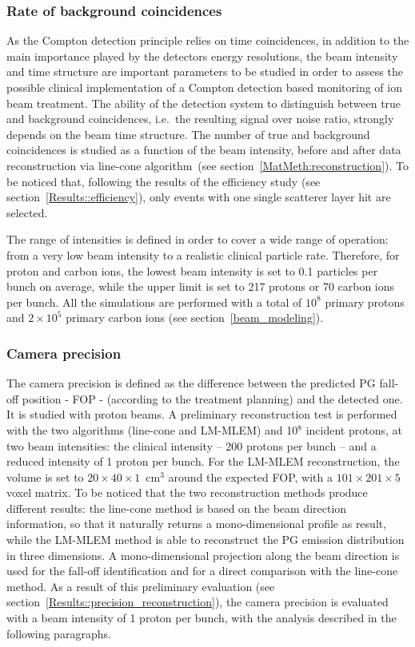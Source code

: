 \subsubsection{Rate of background coincidences}

As the Compton detection principle relies on time coincidences, in addition to the main importance played by the detectors energy resolutions, the beam intensity and time structure are important parameters to be studied in order to assess the possible clinical implementation of a Compton detection based monitoring of ion beam treatment. The ability of the detection system to distinguish between true and background coincidences, i.e.~the resulting signal over noise ratio, strongly depends on the beam time structure. The number of true and background coincidences is studied as a function of the beam intensity, before and after data reconstruction via line-cone algorithm~(see section~\ref{MatMeth:reconstruction}). To be noticed that, following the results of the efficiency study (see section~\ref{Results::efficiency}), only events with one single scatterer layer hit are selected. 

The range of intensities is defined in order to cover a wide range of operation: from a very low beam intensity to a realistic clinical particle rate. Therefore, for proton and carbon ions, the lowest beam intensity is set to 0.1 particles per bunch on average, while the upper limit is set to 217 protons or 70 carbon ions per bunch. All the simulations are performed with a total of $10^{8}$ primary protons and  $2\times10^{5}$ primary carbon ions (see section~\ref{beam_modeling}). %

\subsubsection{Camera precision}
\label{MatMeth:precision}

The camera precision is defined as the difference between the predicted PG fall-off position - FOP - (according to the treatment planning) and the detected one. It is studied with proton beams.
A preliminary reconstruction test is performed with the two algorithms (line-cone and LM-MLEM) and 10$^8$ incident protons, at two beam intensities: the clinical intensity -- 200 protons per bunch -- and a reduced intensity of 1 proton per bunch. For the LM-MLEM reconstruction, the volume is set to $20\times40\times1$~cm$^3$ around the expected FOP, with a $101\times201\times5$ voxel matrix. To be noticed that the two reconstruction methods produce different results: the line-cone method is based on the beam direction information, so that it naturally returns a mono-dimensional profile as result, while the LM-MLEM method is able to reconstruct the PG emission distribution in three dimensions. A mono-dimensional projection along the beam direction is used for the fall-off identification and for a direct comparison with the line-cone method. As a result of this preliminary evaluation (see section~\ref{Results::precision_reconstruction}), the camera precision is evaluated with a beam intensity of 1 proton per bunch, with the analysis described in the following paragraphs.

